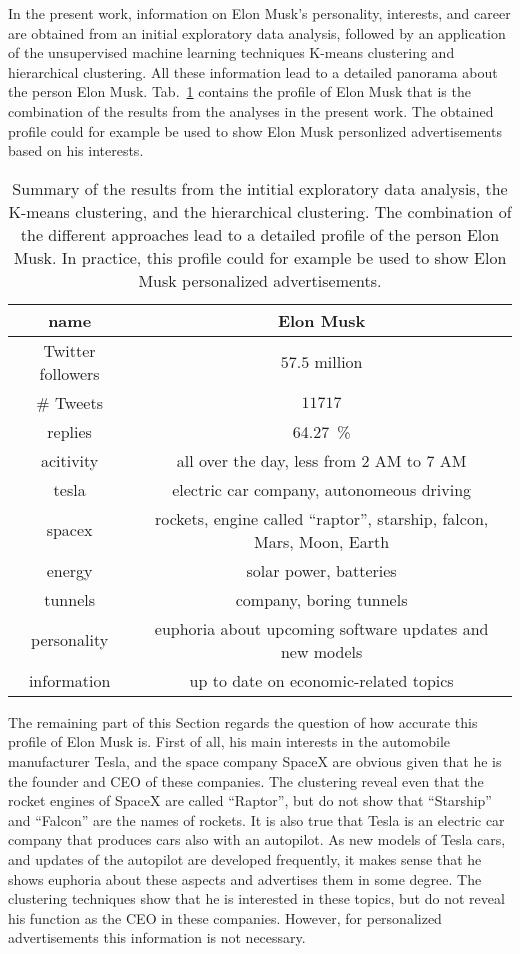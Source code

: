In the present work, information on Elon Musk's personality, interests, and career are obtained from an initial exploratory data analysis, followed by an application of the unsupervised machine learning techniques K-means clustering and hierarchical clustering. All these information lead to a detailed panorama about the person Elon Musk. Tab.~\ref{tab:musk} contains the profile of Elon Musk that is the combination of the results from the analyses in the present work. The obtained profile could for example be used to show Elon Musk personlized advertisements based on his interests.

\begin{table}[h!]
\centering
\begin{tabular}{c|c}
name & Elon Musk \\
\hline
\hline
Twitter followers & $57.5$ million\\
\hline
\# Tweets & $11717$ \\
\hline
replies & \SI{64.27}{\percent}\\
\hline
acitivity & all over the day, less from $2$ AM to $7$ AM\\
\hline
\hline
tesla & electric car company, autonomeous driving\\
\hline
spacex & rockets, engine called \enquote{raptor}, starship, falcon, Mars, Moon, Earth\\
\hline
energy & solar power, batteries\\
\hline
tunnels & company, boring tunnels\\
\hline
\hline
personality & euphoria about upcoming software updates and new models\\
\hline
information & up to date on economic-related topics
\end{tabular}
\caption{Summary of the results from the intitial exploratory data analysis, the K-means clustering, and the hierarchical clustering. The combination of the different approaches lead to a detailed profile of the person Elon Musk. In practice, this profile could for example be used to show Elon Musk personalized advertisements.}
\label{tab:musk}
\end{table}

The remaining part of this Section regards the question of how accurate this profile of Elon Musk is. First of all, his main interests in the automobile manufacturer Tesla, and the space company SpaceX are obvious given that he is the founder and CEO of these companies. The clustering reveal even that the rocket engines of SpaceX are called \enquote{Raptor}, but do not show that \enquote{Starship} and \enquote{Falcon} are the names of rockets. It is also true that Tesla is an electric car company that produces cars also with an autopilot. As new models of Tesla cars, and updates of the autopilot are developed frequently, it makes sense that he shows euphoria about these aspects and advertises them in some degree. The clustering techniques show that he is interested in these topics, but do not reveal his function as the CEO in these companies. However, for personalized advertisements this information is not necessary. 

